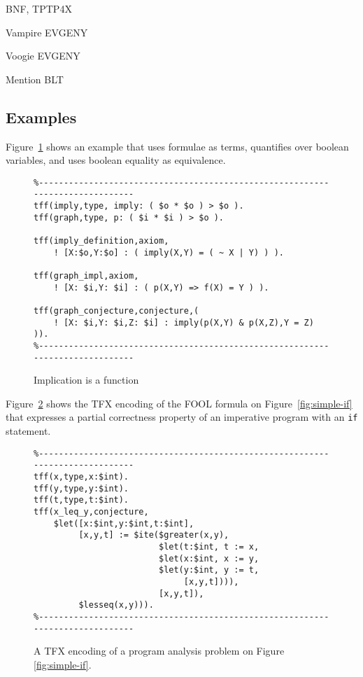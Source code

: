 \documentclass{easychair}
\begin{document}
BNF, TPTP4X

Vampire EVGENY

Voogie EVGENY

Mention BLT \cite{CF17}

\subsection{Examples}
\label{Examples}

Figure~\ref{ImplicationFunction} shows an example that uses formulae as
terms, quantifies over boolean variables, and uses boolean equality as 
equivalence.

\begin{figure}[htbp]
\begin{small}
\begin{verbatim}
%------------------------------------------------------------------------------
tff(imply,type, imply: ( $o * $o ) > $o ).
tff(graph,type, p: ( $i * $i ) > $o ).

tff(imply_definition,axiom,
    ! [X:$o,Y:$o] : ( imply(X,Y) = ( ~ X | Y) ) ).

tff(graph_impl,axiom,
    ! [X: $i,Y: $i] : ( p(X,Y) => f(X) = Y ) ).

tff(graph_conjecture,conjecture,(
    ! [X: $i,Y: $i,Z: $i] : imply(p(X,Y) & p(X,Z),Y = Z) )).
%------------------------------------------------------------------------------
\end{verbatim}
\end{small}
\caption{Implication is a function}
\label{ImplicationFunction}
\end{figure}

Figure~\ref{LetITE} shows the TFX encoding of the FOOL formula on
Figure~\ref{fig:simple-if} that expresses a partial correctness property of an
imperative program with an \texttt{if} statement.

\begin{figure}[htbp]
\begin{small}
\begin{verbatim}
%------------------------------------------------------------------------------
tff(x,type,x:$int).
tff(y,type,y:$int).
tff(t,type,t:$int).
tff(x_leq_y,conjecture,
    $let([x:$int,y:$int,t:$int],
         [x,y,t] := $ite($greater(x,y),
                         $let(t:$int, t := x,
                         $let(x:$int, x := y,
                         $let(y:$int, y := t,
                              [x,y,t]))),
                         [x,y,t]),
         $lesseq(x,y))).
%------------------------------------------------------------------------------
\end{verbatim}
\end{small}
\caption{A TFX encoding of a program analysis problem on Figure
\ref{fig:simple-if}.}
\label{LetITE}
\end{figure}
\end{document}
